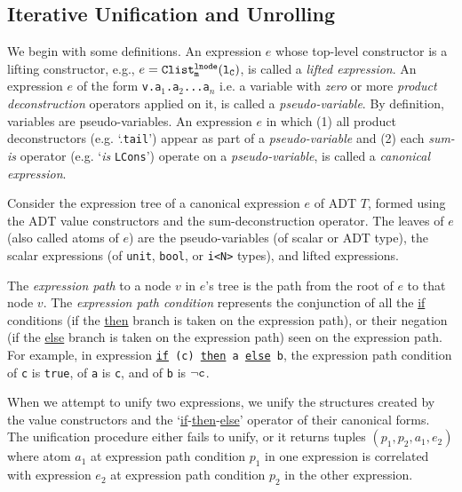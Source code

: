 \subsection{Iterative Unification and Unrolling}
\label{sec:unifyAndUnroll}

We begin with some definitions.
An expression $e$ whose top-level constructor
is a lifting constructor, e.g., $e={\tt Clist^{{\tt lnode}}_m({\tt l}_C)}$,
is called a {\em lifted expression}.
An expression $e$ of the form {\tt v.a$_1$.a$_2$...a$_n$} i.e. a variable
with {\em zero} or more {\em product deconstruction} operators applied on it, is called a {\em pseudo-variable}.
By definition, variables are pseudo-variables.
An expression $e$ in which (1) all product deconstructors (e.g. `.{\tt tail}') appear as part
of a {\em pseudo-variable} and (2) each {\em sum-is} operator (e.g. `{\em is} {\tt LCons}')
operate on a {\em pseudo-variable}, is called a {\em canonical expression}.

Consider the expression tree of a canonical expression $e$ of ADT $T$,
formed using the ADT value constructors and the \sumDtor{}
sum-deconstruction operator.
The leaves of $e$ (also called atoms of $e$) are
the pseudo-variables (of scalar or ADT type),
the scalar expressions (of {\tt unit}, {\tt bool}, or {\tt i<N>} types),
and lifted expressions.

The
{\em expression path} to a node $v$ in $e$'s tree
is the path from the root of $e$
to that node $v$. The {\em expression path condition} represents
the conjunction of all the \underline{if} conditions (if
the \underline{then} branch is taken on the expression path), or their
negation (if the \underline{else} branch is taken on the
expression path) seen on the expression path.  For example,
in expression {\tt \underline{if} (c) \underline{then} a \underline{else} b},
the expression path condition of {\tt c} is {\tt true}, of {\tt a} is {\tt c},
and of {\tt b} is $\neg{\tt c}$.

When we attempt to unify two expressions, we unify the
structures created by the value constructors and the `\underline{if}-\underline{then}-\underline{else}'
operator of their canonical forms.
The unification procedure either fails to unify, or it
returns tuples $(p_1,p_2,a_1,e_2)$ where atom $a_1$
at expression path condition $p_1$ in one expression is correlated with
expression $e_2$ at expression path condition $p_2$ in the other expression.

